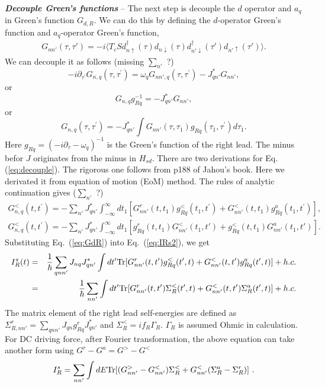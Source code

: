 \documentclass[aps,prb,superscriptaddress]{revtex4-2}
\begin{document}
{\noindent \textbf{\textit{Decouple Green's functions}}} -- The next step is decouple the $d$ operator and $a_q$ in Green's function $G_{d,R}$. We can do this by defining the $d$-operator Green's function and $a_{q}$-operator Green's function,
\begin{gather}\label{eq:Gd}
G_{nn'}(\tau,\tau') = -i\langle T_c S d^{\dagger}_{n\uparrow}(\tau) d_{n\downarrow}(\tau) d^{\dagger}_{n'\downarrow}(\tau') d_{n'\uparrow}(\tau') \rangle .
\end{gather}
We can decouple it as follows (missing $\sum_{n'}$ ?)
\begin{equation}
-i \partial_{\tau^{\prime}} G_{n, q}\left(\tau, \tau^{\prime}\right)=\omega_{q} G_{nn',q}\left(\tau, \tau^{\prime}\right)-J_{qn'}^{*} G_{nn'},
\end{equation}
or
\begin{equation}
G_{n, q} g_{R q}^{-1}=-J_{qn'}^{*} G_{nn'},
\end{equation}
or
\begin{equation}\label{eq:decouple}
G_{n, q}\left(\tau, \tau^{\prime}\right)=-J_{qn'}^{*} \int G_{nn'}\left(\tau, \tau_{1}\right) g_{R q}\left(\tau_{1}, \tau^{\prime}\right) d \tau_{1}.
\end{equation}
Here $g_{Rq}=(-i\partial_{\tau} -\omega_q)^{-1}$ is the Green’s function of the right lead. The minus befor $J$ originates from the minus in $H_{sd}$. There are two derivations for Eq.(\ref{eq:decouple}). The rigorous one follows from p188 of Jahou's book. Here we derivated it from equation of motion (EoM) method. The rules of analytic continuation gives ($\sum_{n'}$ ?)
\begin{gather}\label{eq:GdR}
G_{n, q}^{<}\left(t, t^{\prime}\right)=-\sum_{n'} J_{qn'}^{*} \int_{-\infty}^{\infty}dt_{1} [G_{nn'}^{r}\left(t, t_{1}\right) g_{R q}^{<}\left(t_{1}, t^{\prime}\right) + G_{nn'}^{<}\left(t, t_{1}\right) g_{R q}^{a}\left(t_{1}, t^{\prime}\right)],\\
G_{n,q}^{<}\left(t, t^{\prime}\right)=-\sum_{n'} J_{qn'}^{*} \int_{-\infty}^{\infty}dt_{1} [g_{R q}^{r}\left(t, t_{1}\right) G_{nn'}^{<}\left(t_{1}, t'\right)  + g_{R q}^{<}\left(t, t_{1}\right) G_{nn'}^{a}\left(t_{1}, t'\right)].
\end{gather}
Substituting Eq.~(\ref{eq:GdR}) into Eq.~(\ref{eq:IRs2}), we get
\begin{eqnarray}\label{Iright}
I_R^s(t)  &=& \frac{1}{\hbar}\sum_{qnn'} J_{nq} J_{qn'}^{*}\int dt'{\rm Tr}[G_{nn'}^r(t,t') g_{Rq}^<(t',t) + G_{nn'}^<(t,t') g_{Rq}^a(t',t)]+ h.c. \\
&=& \frac{1}{\hbar}\sum_{nn'}\int dt'{\rm Tr}[G_{nn'}^r(t,t') \Sigma_{R}^<(t',t) + G_{nn'}^<(t,t') \Sigma_{R}^a(t',t)]+ h.c.
\end{eqnarray}
The matrix element of the right lead self-energies are defined as $\Sigma_{R,nn'}^r=\sum_{qnn'}J_{qn}g_{Rq}^rJ_{qn'}^{*}$ and $\Sigma_R^{<}=if_R\Gamma_R$. $\Gamma_R$ is assumed Ohmic in calculation. For DC driving force, after Fourier transformation, the above equation can take another form using $G^r -G^a=G^{>}-G^{<}$
\begin{gather}
I_R^s = \sum_{nn'}\int dE {\rm Tr} [(G_{nn'}^>-G_{nn'}^<)\Sigma^<_{R} + G_{nn'}^< (\Sigma_{R}^a -\Sigma_{R}^r)]~. \label{up1}
\end{gather}
\end{document}
